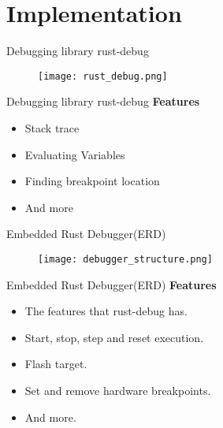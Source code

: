\section{Implementation}

\begin{frame}{Debugging library rust-debug}
	\begin{figure}
		\texttt{[image: rust\_debug.png]}
	\end{figure}
\end{frame}


\begin{frame}{Debugging library rust-debug}
	\textbf{Features}
    \begin{itemize}
        \item Stack trace
        \item Evaluating Variables
        \item Finding breakpoint location
        \item And more
    \end{itemize}
\end{frame}


\begin{frame}{Embedded Rust Debugger(ERD)}
	\begin{figure}
		\texttt{[image: debugger\_structure.png]}
	\end{figure}
\end{frame}


\begin{frame}{Embedded Rust Debugger(ERD)}
	\textbf{Features}
    \begin{itemize}
	\item The features that rust-debug has.
	\item Start, stop, step and reset execution.
	\item Flash target.
	\item Set and remove hardware breakpoints.
	\item And more.
    \end{itemize}
\end{frame}

